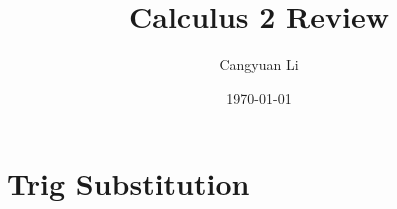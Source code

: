 \documentclass[14pt]{extreport}
\title{Calculus 2 Review}
\author{Cangyuan Li}
\date{\today}
\begin{document}
    
\maketitle

\section{Trig Substitution}
\end{document}
